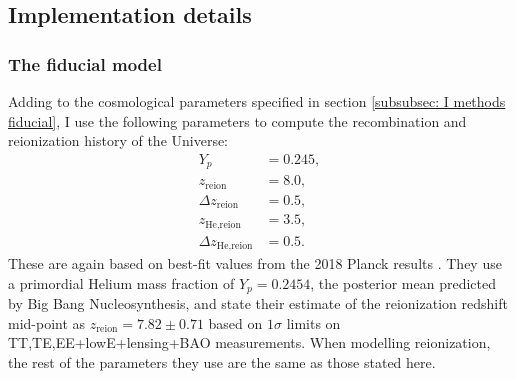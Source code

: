 \documentclass{aa}
\numberwithin{equation}{section}
\numberwithin{table}{section}
\numberwithin{figure}{section}
\begin{document}
\subsection{Implementation details}\label{subsec: II methods}

\subsubsection{The fiducial model}
Adding to the cosmological parameters specified in section \ref{subsubsec: I methods fiducial}, I use the following parameters to compute the recombination and reionization history of the Universe:
\begin{align*}
  Y_p &= 0.245,
  \\
  z_\text{reion} &= 8.0,
  \\
  \Delta z_\text{reion} &= 0.5,
  \\
  z_\text{He,reion} &= 3.5,
  \\
  \Delta z_\text{He,reion} &= 0.5.
\end{align*}
These are again based on best-fit values from the 2018 Planck results \citep[see][]{Planck}. They use a primordial Helium mass fraction of $Y_p=0.2454$, the posterior mean predicted by Big Bang Nucleosynthesis, and state their estimate of the reionization redshift mid-point as $z_\text{reion}=7.82\pm0.71$ based on $1\sigma$ limits on TT,TE,EE+lowE+lensing+BAO measurements. When modelling reionization, the rest of the parameters they use are the same as those stated here.
\end{document}
